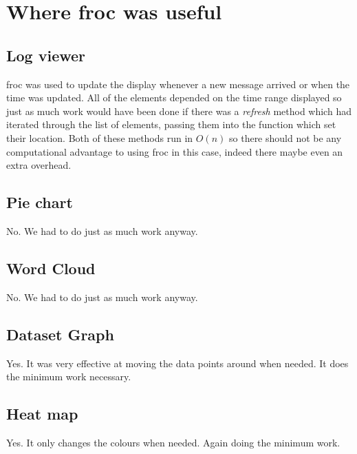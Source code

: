 
\section{Where froc was useful}
\subsection{Log viewer}
froc was used to update the display whenever a new message arrived or when the time was updated. All of the elements depended on the time range displayed so just as much work would have been done if there was a \emph{refresh} method which had iterated through the list of elements, passing them into the function which set their location. Both of these methods run in $O(n)$ so there should not be any computational advantage to using froc in this case, indeed there maybe even an extra overhead.
\subsection{Pie chart}
No. We had to do just as much work anyway.
\subsection{Word Cloud}
No. We had to do just as much work anyway.
\subsection{Dataset Graph}
Yes. It was very effective at moving the data points around when needed. It does the minimum work necessary.
\subsection{Heat map}
Yes. It only changes the colours when needed. Again doing the minimum work.
